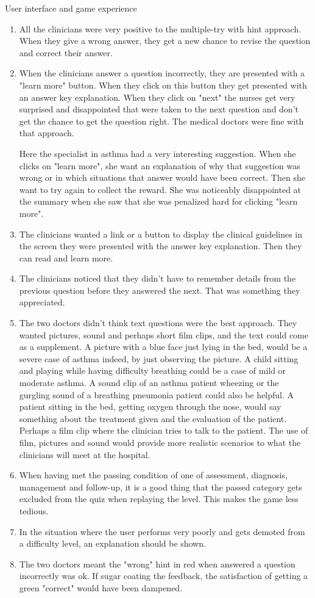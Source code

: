 User interface and game experience
 \begin{enumerate}
 	\item All the clinicians were very positive to the multiple-try with hint approach. When they give a wrong answer, they get a new chance to revise the question and correct their answer.
 	\item When the clinicians answer a question incorrectly, they are presented with a "learn more" button. When they click on this button they get presented with an answer key explanation. When they click on "next" the nurses get very surprised and disappointed that were taken to the next question and don't get the chance to get the question right. The medical doctors were fine with that approach.
 	
 	Here the specialist in asthma had a very interesting suggestion. When she clicks on "learn more", she want an explanation of why that suggestion was wrong or in which situations that answer would have been correct. Then she want to try again to collect the reward. She was noticeably disappointed at the summary when she saw that she was penalized hard for clicking "learn more".
 	\item The clinicians wanted a link or a button to display the clinical guidelines in the screen they were presented with the answer key explanation. Then they can read and learn more.
 	\item The clinicians noticed that they didn't have to remember details from the previous question before they answered the next. That was something they appreciated.
 	\item The two doctors didn't think text questions were the best approach. They wanted pictures, sound and perhaps short film clips, and the text could come as a supplement. A picture with a blue face just lying in the bed, would be a severe case of asthma indeed, by just observing the picture. A child sitting and playing while having difficulty breathing could be a case of mild or moderate asthma. A sound clip of an asthma patient wheezing or the gurgling sound of a breathing pneumonia patient could also be helpful. A patient sitting in the bed, getting oxygen through the nose, would say something about the treatment given and the evaluation of the patient. Perhaps a film clip where the clinician tries to talk to the patient. The use of film, pictures and sound would provide more realistic scenarios to what the clinicians will meet at the hospital.
 	\item When having met the passing condition of one of assessment, diagnosis, management and follow-up, it is a good thing that the passed category gets excluded from the quiz when replaying the level. This makes the game less tedious.
 	\item In the situation where the user performs very poorly and gets demoted from a difficulty level, an explanation should be shown.
 	\item The two doctors meant the "wrong" hint in red when answered a question incorrectly was ok. If sugar coating the feedback, the satisfaction of getting a green "correct" would have been dampened.
\end{enumerate}





